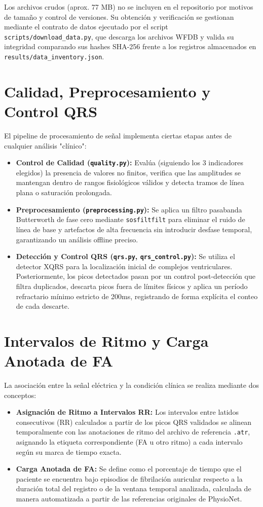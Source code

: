 \documentclass[11pt,a4paper]{article}
\begin{document}
Los archivos crudos (aprox. 77 MB) no se incluyen en el repositorio por motivos de tamaño y control de versiones. Su obtención y verificación se gestionan mediante el contrato de datos ejecutado por el script \texttt{scripts/download\_data.py}, que descarga los archivos WFDB y valida su integridad comparando sus hashes SHA-256 frente a los registros almacenados en \texttt{results/data\_inventory.json}.

\section{Calidad, Preprocesamiento y Control QRS}
El pipeline de procesamiento de señal implementa ciertas etapas antes de cualquier análisis "clínico":
\begin{itemize}
    \item \textbf{Control de Calidad (\texttt{quality.py}):} Evalúa (siguiendo los 3 indicadores elegidos) la presencia de valores no finitos, verifica que las amplitudes se mantengan dentro de rangos fisiológicos válidos y detecta tramos de línea plana o saturación prolongada.
    \item \textbf{Preprocesamiento (\texttt{preprocessing.py}):} Se aplica un filtro pasabanda Butterworth de fase cero mediante \texttt{sosfiltfilt} para eliminar el ruido de línea de base y artefactos de alta frecuencia sin introducir desfase temporal, garantizando un análisis offline preciso.
    \item \textbf{Detección y Control QRS (\texttt{qrs.py}, \texttt{qrs\_control.py}):} Se utiliza el detector XQRS para la localización inicial de complejos ventriculares. Posteriormente, los picos detectados pasan por un control post-detección que filtra duplicados, descarta picos fuera de límites físicos y aplica un período refractario mínimo estricto de \num{200}\si{ms}, registrando de forma explícita el conteo de cada descarte.
\end{itemize}

\section{Intervalos de Ritmo y Carga Anotada de FA}
La asociación entre la señal eléctrica y la condición clínica se realiza mediante dos conceptos:
\begin{itemize}
    \item \textbf{Asignación de Ritmo a Intervalos RR:} Los intervalos entre latidos consecutivos (RR) calculados a partir de los picos QRS validados se alinean temporalmente con las anotaciones de ritmo del archivo de referencia \texttt{.atr}, asignando la etiqueta correspondiente (FA u otro ritmo) a cada intervalo según su marca de tiempo exacta.
    \item \textbf{Carga Anotada de FA:} Se define como el porcentaje de tiempo que el paciente se encuentra bajo episodios de fibrilación auricular respecto a la duración total del registro o de la ventana temporal analizada, calculada de manera automatizada a partir de las referencias originales de PhysioNet.
\end{itemize}
\end{document}
